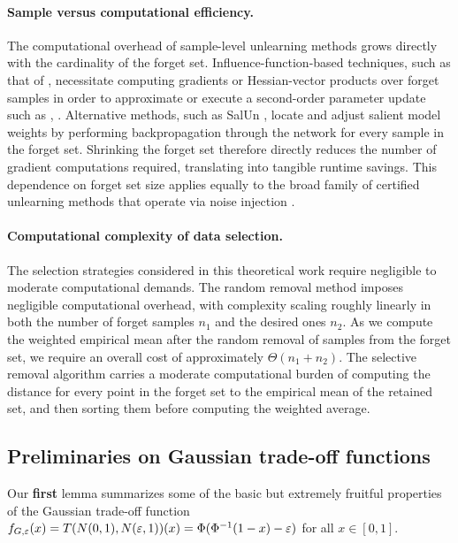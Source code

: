 \paragraph{Sample versus computational efficiency. }
The computational overhead of sample-level unlearning methods grows directly with the cardinality of the forget set. Influence-function-based techniques, such as that of \citet{guo2020certified}, necessitate computing gradients or Hessian-vector products over forget samples in order to approximate or execute a second-order parameter update such as \citet{zou2025certified}, \citet{pandey2026gaussian}. Alternative methods, such as SalUn \citet{fan2024salun}, locate and adjust salient model weights by performing backpropagation through the network for every sample in the forget set. Shrinking the forget set therefore directly reduces the number of gradient computations required, translating into tangible runtime savings. This dependence on forget set size applies equally to the broad family of certified unlearning methods that operate via noise injection \citet{chourasia2023forget, allouah2024utility, waerebeke2025when}.


\paragraph{Computational complexity of data selection. }

The selection strategies considered in this theoretical work require negligible to moderate computational demands. The random removal method imposes negligible computational overhead, with complexity scaling roughly linearly in both the number of forget samples $n_1$ and the desired ones $n_2$. As we compute the weighted empirical mean after the random removal of samples from the forget set, we require an overall cost of approximately $\Theta(n_1 +n_2)$. The selective removal algorithm carries a moderate computational burden of computing the distance for every point in the forget set to the empirical mean of the retained set, and then sorting them before computing the weighted average.


\subsection{Preliminaries on Gaussian trade-off functions}\label{sec:prelimGTOF}
Our \textbf{first} lemma summarizes some of the basic but extremely fruitful properties of the Gaussian trade-off function $f_{G, \varepsilon}(x)=T(N(0,1), N(\varepsilon,1))(x)= \Phi(\Phi^{-1}(1-x) - \varepsilon)$ for all $x \in [0,1]$. 

